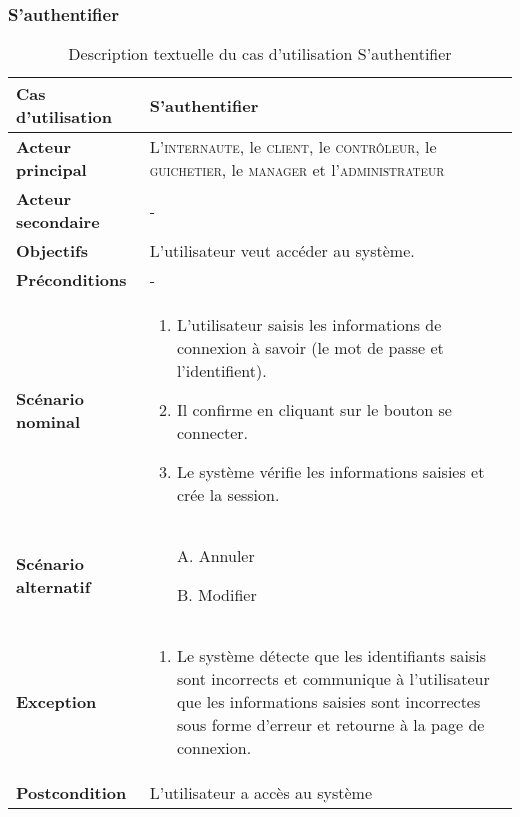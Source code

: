         \subsubsection[S’authentifier]{S’authentifier}
            \begin{longtable}{p{4cm} p{9cm}}
                \caption{Description textuelle du cas d’utilisation S’authentifier}
                \label{table:usecaseSauth}
                \\\hline\hline
                    \textbf{Cas d’utilisation} & \textbf{S’authentifier}
                \\\hline\hline
                        \textbf{Acteur principal} & L’\textsc{internaute}, le \textsc{client},
                        le \textsc{contrôleur},
                        le \textsc{guichetier}, le \textsc{manager} et l’\textsc{administrateur}
                    \\
                        \textbf{Acteur secondaire} & -
                    \\
                        \textbf{Objectifs} & L’utilisateur veut accéder au système.
                    \\
                        \textbf{Préconditions} & -
                    \\
                    \textbf{Scénario nominal} &
                        \begin{enumerate}[leftmargin=*]
                            \item L’utilisateur saisis les informations de connexion à savoir (le mot de
                            passe et l’identifient).
                            \item Il confirme en cliquant sur le bouton se connecter.
                            \item Le système vérifie les informations saisies et crée la session.
                        \end{enumerate}
                    \\
                    \textbf{Scénario alternatif} &
                    \begin{enumerate}[leftmargin=*]
                            \item [A.] Annuler
                            \item [B.] Modifier
                        \end{enumerate}
                    \\
                    \textbf{Exception} &
                    \begin{enumerate}[leftmargin=*]
                            \item Le système détecte que les identifiants saisis sont incorrects et communique à
                            l’utilisateur que les informations saisies sont incorrectes sous forme d’erreur et
                            retourne à la page de connexion.
                        \end{enumerate}
                    \\
                    \textbf{Postcondition} & L’utilisateur a accès au système
                \\\bottomrule
            \end{longtable}

